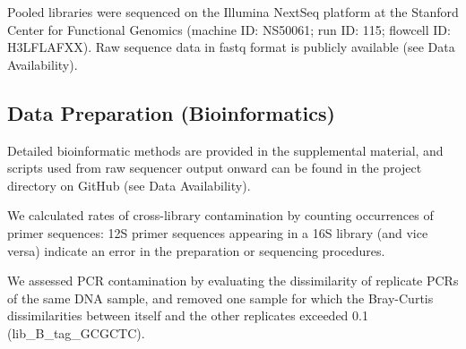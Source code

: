 \documentclass[11pt,letterpaper]{article} %
\begin{document}
Pooled libraries were sequenced on the Illumina NextSeq platform at the Stanford Center for Functional Genomics (machine ID: NS50061; run ID: 115; flowcell ID: H3LFLAFXX). Raw sequence data in fastq format is publicly available (see Data Availability).

\subsection*{Data Preparation (Bioinformatics)}
Detailed bioinformatic methods are provided in the supplemental material, and scripts used from raw sequencer output onward can be found in the project directory on GitHub (see Data Availability).



%
%
%
We calculated rates of cross-library contamination by counting occurrences of primer sequences: 12S primer sequences appearing in a 16S library (and vice versa) indicate an error in the preparation or sequencing procedures.

We assessed PCR contamination by evaluating the dissimilarity of replicate PCRs of the same DNA sample, and removed one sample for which the Bray-Curtis dissimilarities between itself and the other replicates exceeded 0.1 (lib\_B\_tag\_GCGCTC).
\end{document}
